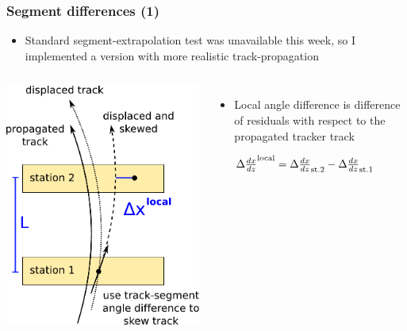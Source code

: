 \documentclass[compress]{beamer}
\begin{document}
\begin{frame}
\frametitle{Segment differences (1)}

\begin{itemize}
\item Standard segment-extrapolation test was unavailable this week, so I implemented a version with more realistic track-propagation
\end{itemize}

\vspace{-0.4 cm}
\begin{columns}
\includegraphics[width=\linewidth]{segdiff_cartoon.pdf}

\begin{itemize}
\item Local angle difference is difference of residuals with respect to the propagated tracker track

$\Delta \frac{dx}{dz}^{\mbox{\scriptsize local}} = \Delta \frac{dx}{dz}_{\mbox{\scriptsize st.2}} - \Delta \frac{dx}{dz}_{\mbox{\scriptsize st.1}}$


\end{itemize}
\end{columns}
\end{frame}
\end{document}
